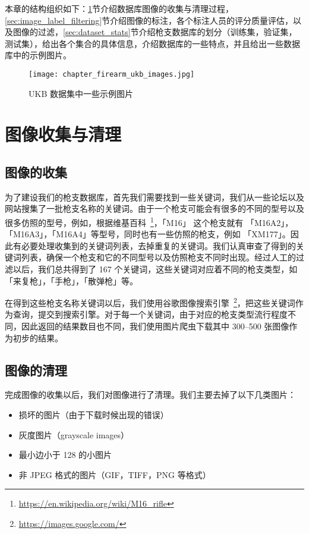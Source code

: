 本章的结构组织如下：\ref{sec:image_collect_clean}节介绍数据库图像的收集与清理过程，\ref{sec:image_label_filtering}节介绍图像的标注，各个标注人员的评分质量评估，以及图像的过滤，\ref{sec:dataset_stats}节介绍枪支数据库的划分（训练集，验证集，测试集），给出各个集合的具体信息，介绍数据库的一些特点，并且给出一些数据库中的示例图片。

\begin{figure}[!t]
	\centering
	\texttt{[image: chapter\_firearm\_ukb\_images.jpg]}
	\caption{UKB 数据集中一些示例图片}
	\label{fig:ukb_images}
\end{figure}

\section{图像收集与清理}\label{sec:image_collect_clean}
\subsection{图像的收集}
为了建设我们的枪支数据库，首先我们需要找到一些关键词，我们从一些论坛以及网站搜集了一批枪支名称的关键词。由于一个枪支可能会有很多的不同的型号以及很多仿照的型号，例如，根据维基百科~\footnote{\url{https://en.wikipedia.org/wiki/M16_rifle}}，「M16」 这个枪支就有 「M16A2」，「M16A3」，「M16A4」等型号，同时也有一些仿照的枪支，例如 「XM177」。因此有必要处理收集到的关键词列表，去掉重复的关键词。我们认真审查了得到的关键词列表，确保一个枪支和它的不同型号以及仿照枪支不同时出现。经过人工的过滤以后，我们总共得到了 167 个关键词，这些关键词对应着不同的枪支类型，如「来复枪」，「手枪」，「散弹枪」等。

在得到这些枪支名称关键词以后，我们使用谷歌图像搜索引擎~\footnote{\url{https://images.google.com/}}，把这些关键词作为查询，提交到搜索引擎。对于每一个关键词，由于对应的枪支类型流行程度不同，因此返回的结果数目也不同，我们使用图片爬虫下载其中 300--500 张图像作为初步的结果。

\subsection{图像的清理}
完成图像的收集以后，我们对图像进行了清理。我们主要去掉了以下几类图片：
\begin{itemize}
\item 损坏的图片（由于下载时候出现的错误）
\item 灰度图片（grayscale images）
\item 最小边小于 128 的小图片
\item 非 JPEG 格式的图片（GIF，TIFF，PNG 等格式）
\end{itemize}


